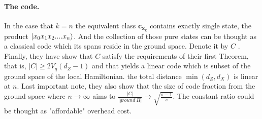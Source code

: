 \documentclass{article}
\begin{document}
\paragraph{The code.} In the case that \(k = n\) the equivalent class  \(\mathbf{c_{x_{k}}} \) contains exactly single state, the product \( \ket{x_0 x_1 x_2 .... x_n} \). And the collection of those pure states can be thought as a classical code which its spans reside in the ground space. Denote it by \(C\) . Finally, they have show that \( C \) satisfy the requirements of their first Theorem, that is, \( |C| \ge 2V_q \left(d_Z -1 \right) \) and that yields a linear code which is subset of the ground space of the local Hamiltonian. the total distance \( \min \left( d_Z, d_X \right) \) is linear at \(n\). Last important note, they also show that the size of code fraction from the ground space where \(n\rightarrow\infty\) aims to \( \frac{|C|}{ |ground\ H |} \rightarrow \sqrt{\frac{s-1}{s}} \). The constant ratio could be thought as "affordable" overhead cost.
\end{document}

